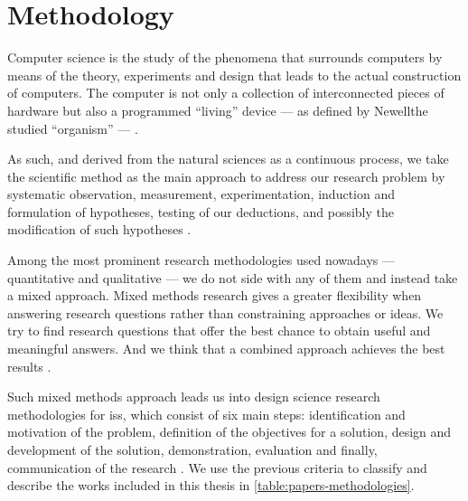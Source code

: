 \section{Methodology}
    \label{section:thesis:methodology}
Computer science is the study of the phenomena that surrounds computers by means 
of the theory, experiments and design that leads to the actual construction of computers. 
The computer is not only a collection of interconnected pieces of hardware but also 
a programmed ``living'' device --- as defined by Newell\etal the studied ``organism'' 
--- \cite{NewellS76}.

As such, and derived from the natural sciences as a continuous process, we take 
the scientific method as the main approach to address our research problem by systematic 
observation, measurement, experimentation, induction and formulation of hypotheses, 
testing of our deductions, and possibly the modification of such hypotheses \cite{Oxford14}.

Among the most prominent research methodologies used nowadays --- quantitative and 
qualitative --- we do not side with any of them and instead take a mixed approach. 
Mixed methods research gives a greater flexibility when answering research questions 
rather than constraining approaches or ideas. We try to find research questions 
that offer the best chance to obtain useful and meaningful answers. And we think 
that a combined approach achieves the best results \cite{JohnsonO04}.

Such mixed methods approach leads us into design science research methodologies 
for \acp{is}, which consist of six main steps: identification and motivation of the 
problem, definition of the objectives for a solution, design and development of 
the solution, demonstration, evaluation and finally, communication of the research 
\cite{PeffersTRC07}. We use the previous criteria to classify and describe the works 
included in this thesis in \cref{table:papers-methodologies}.

